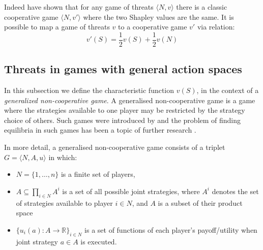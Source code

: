 Indeed \cite{KOHLBERG2018139} have shown that for any game of threats $\langle N,v\rangle$ there is a classic cooperative game $\langle N,v'\rangle$ where the two Shapley values are the same.
It is possible to map a game of threats $v$ to a cooperative game $v'$ via relation:
\begin{equation}\label{convert1}
v'(S)=\frac{1}{2}v(S)+\frac{1}{2}v(N)
\end{equation}


\subsection{Threats in games with general action spaces}\label{the_value_def3}

In this subsection we define the characteristic function $v(S)$, in the context of a \textit{generalized non-cooperative game}.
A generalised non-cooperative game is a game where the strategies available to one player may be restricted by the strategy choice of others.
Such games were introduced by \cite{Debreu01101952} and the problem of finding equilibria in such games has been a topic of further research \citep{Facchinei2007,fischer2014}.

In more detail, a generalised non-cooperative game consists of a triplet $G = \langle N,A,u \rangle$ in which:
\begin{itemize}
\item	$N=\{1,\dots,n\}$ is a finite set of players,
\item	$A\subseteq \prod_{i\in N}A^i$ is a set of all possible joint strategies, where $A^i$ denotes the set of strategies available to player $i\in N$, and $A$ is a subset of their product space
\item	$\{u_i(a) : A\rightarrow \mathbb{R}\}_{i\in N}$ is a set of functions of each player's payoff/utility when joint strategy $a\in A$ is executed.
\end{itemize}


